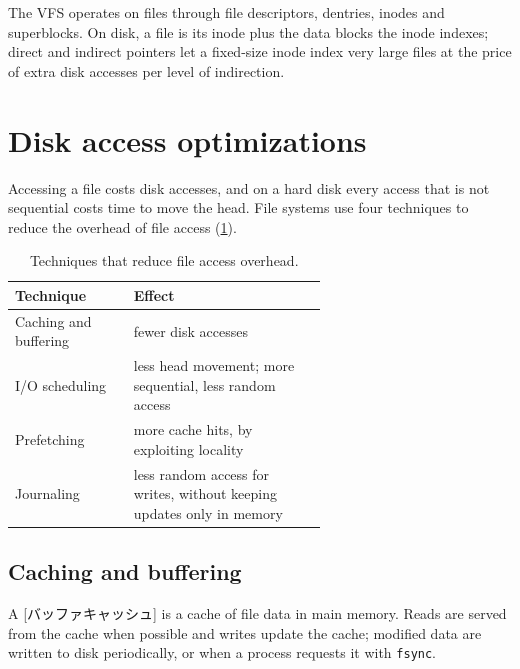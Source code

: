 \documentclass[../main.tex]{subfiles}
\begin{document}
\begin{keypoint}
  The VFS operates on files through file descriptors, dentries, inodes and
  superblocks.  On disk, a file is its inode plus the data blocks the inode
  indexes; direct and indirect pointers let a fixed-size inode index very
  large files at the price of extra disk accesses per level of indirection.
\end{keypoint}

\section{Disk access optimizations}
\label{sec:l11-optim}

Accessing a file costs disk accesses, and on a hard disk every access that
is not sequential costs time to move the head.  File systems use four techniques to reduce the
overhead of file access (\cref{tab:l11-optim}).

\begin{table}[htbp]
  \centering
  \caption{Techniques that reduce file access overhead.}
  \label{tab:l11-optim}
  \small
  \begin{tabular}{@{}l>{\raggedright\arraybackslash}p{0.62\linewidth}@{}}
    \toprule
    Technique & Effect \\
    \midrule
    Caching and buffering & fewer disk accesses \\
    I/O scheduling & less head movement; more sequential, less random
      access \\
    Prefetching & more cache hits, by exploiting locality \\
    Journaling & less random access for writes, without keeping updates
      only in memory \\
    \bottomrule
  \end{tabular}
\end{table}

\subsection{Caching and buffering}

\begin{definition}
  A [バッファキャッシュ] is a cache of file data in main
  memory.  Reads are served from the cache when possible and writes update
  the cache; modified data are written to disk periodically, or when a
  process requests it with \texttt{fsync}.
\end{definition}
\end{document}
